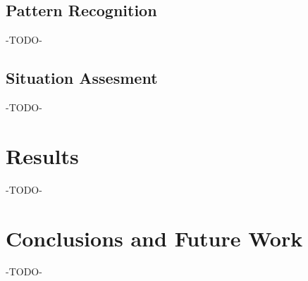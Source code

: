 \documentclass[10pt,twocolumn,letterpaper]{article}
\begin{document}
\subsection{Pattern Recognition}

-TODO-

\subsection{Situation Assesment}

-TODO-

\section{Results}

-TODO-

\section{Conclusions and Future Work}

-TODO-

{\small


}
\end{document}
